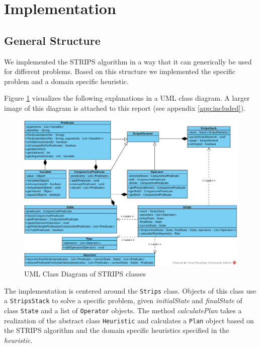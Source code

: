 \section{Implementation}

\subsection{General Structure}
\label{sub:genstruct}

We implemented the STRIPS algorithm in a way that it can generically be used for different problems. Based on this structure we implemented the specific problem and a domain specific heuristic.

Figure \ref{fig:uml1} visualizes the following explanations in a UML class diagram. A larger image of this diagram is attached to this report (see appendix \ref{app:included}).

\begin{figure}[hbt]
  \includegraphics[width=1.1\textwidth]{uml/CD1}
  \caption{UML Class Diagram of STRIPS classes}
  \label{fig:uml1}
\end{figure}

The implementation is centered around the \texttt{Strips} class. Objects of this class use a \texttt{StripsStack} to solve a specific problem, given \textit{initialState} and \textit{finalState} of class \texttt{State} and a list of \texttt{Operator} objects. The method \textit{calculatePlan} takes a realization of the abstract class \texttt{Heuristic} and calculates a \texttt{Plan} object based on the STRIPS algorithm and the domain specific heuristics specified in the \textit{heuristic}. 

